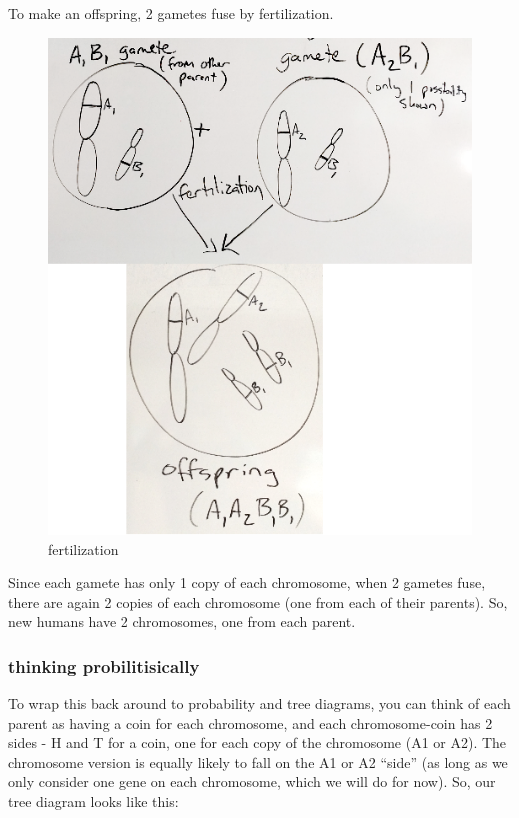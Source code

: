 \documentclass[]{book}
\theoremstyle{definition}
\theoremstyle{definition}
\theoremstyle{definition}
\theoremstyle{remark}
\begin{document}
To make an offspring, 2 gametes fuse by fertilization.

\begin{figure}

{\centering \includegraphics[width=0.75\linewidth]{01-basics-figures/meiosis3} 

}

\caption{fertilization}\label{fig:gen-fig-3}
\end{figure}

Since each gamete has only 1 copy of each chromosome, when 2 gametes
fuse, there are again 2 copies of each chromosome (one from each of
their parents). So, new humans have 2 chromosomes, one from each parent.

\subsubsection{thinking
probilitisically}\label{thinking-probilitisically}

To wrap this back around to probability and tree diagrams, you can think
of each parent as having a coin for each chromosome, and each
chromosome-coin has 2 sides - H and T for a coin, one for each copy of
the chromosome (A1 or A2). The chromosome version is equally likely to
fall on the A1 or A2 ``side'' (as long as we only consider one gene on
each chromosome, which we will do for now). So, our tree diagram looks
like this:
\end{document}

